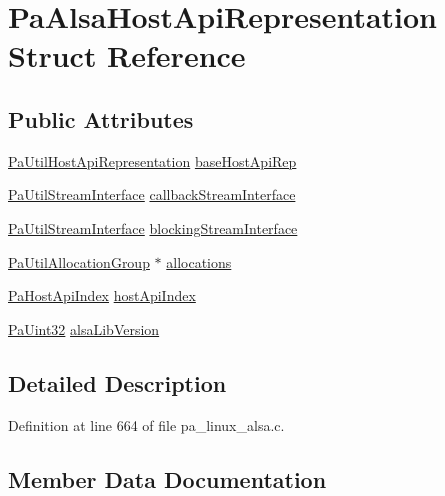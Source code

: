 \hypertarget{struct_pa_alsa_host_api_representation}{}\section{Pa\+Alsa\+Host\+Api\+Representation Struct Reference}
\label{struct_pa_alsa_host_api_representation}
\subsection*{Public Attributes}
\begin{DoxyCompactItemize}
\item 
\hyperlink{struct_pa_util_host_api_representation}{Pa\+Util\+Host\+Api\+Representation} \hyperlink{struct_pa_alsa_host_api_representation_a9a5d2130ae6a1d8826fd265e44eaa1a6}{base\+Host\+Api\+Rep}
\item 
\hyperlink{struct_pa_util_stream_interface}{Pa\+Util\+Stream\+Interface} \hyperlink{struct_pa_alsa_host_api_representation_a7460a29aab991224df3e958f068ad1cd}{callback\+Stream\+Interface}
\item 
\hyperlink{struct_pa_util_stream_interface}{Pa\+Util\+Stream\+Interface} \hyperlink{struct_pa_alsa_host_api_representation_ad6a68540d8914bef7af546594c701634}{blocking\+Stream\+Interface}
\item 
\hyperlink{struct_pa_util_allocation_group}{Pa\+Util\+Allocation\+Group} $\ast$ \hyperlink{struct_pa_alsa_host_api_representation_ac4095eb12c9265fd690964b4afac3932}{allocations}
\item 
\hyperlink{portaudio_8h_aeef6da084c57c70aa94be97411e19930}{Pa\+Host\+Api\+Index} \hyperlink{struct_pa_alsa_host_api_representation_af50c4c8ec89a0f6277539588e5bd142d}{host\+Api\+Index}
\item 
\hyperlink{pa__types_8h_a9cff423f720226e66a7826c30509c465}{Pa\+Uint32} \hyperlink{struct_pa_alsa_host_api_representation_a6b697f7d06e5451c66f09f5562b99d5d}{alsa\+Lib\+Version}
\end{DoxyCompactItemize}


\subsection{Detailed Description}


Definition at line 664 of file pa\+\_\+linux\+\_\+alsa.\+c.



\subsection{Member Data Documentation}
